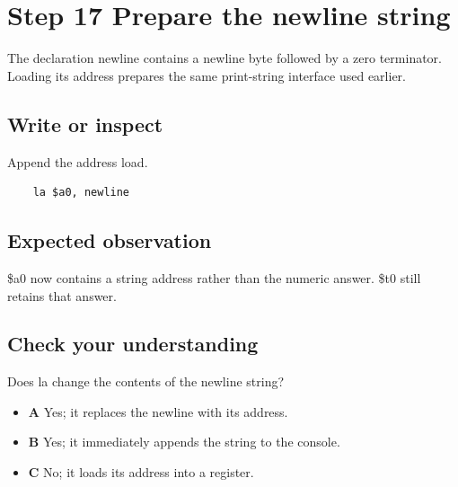 \section{Step 17 Prepare the newline
  string}\label{001-console-calculation-s17-step-17-prepare-the-newline-string}

The declaration newline contains a newline byte followed by a zero
terminator. Loading its address prepares the same print-string interface
used earlier.

\subsection{Write or
  inspect}\label{001-console-calculation-s17-write-or-inspect}

Append the address load.

\begin{verbatim}
    la $a0, newline
\end{verbatim}

\subsection{Expected
  observation}\label{001-console-calculation-s17-expected-observation}

\$a0 now contains a string address rather than the numeric answer. \$t0
still retains that answer.

\subsection{Check your
  understanding}\label{001-console-calculation-s17-check-your-understanding}

Does la change the contents of the newline string?

\begin{itemize}
  \tightlist
  \item
        \textbf{A} Yes; it replaces the newline with its address.
  \item
        \textbf{B} Yes; it immediately appends the string to the console.
  \item
        \textbf{C} No; it loads its address into a register.
\end{itemize}
